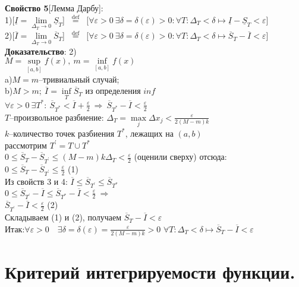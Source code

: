 \documentclass[a4paper,12pt]{article} %
\begin{document}
\noindent \textbf{Свойство 5}[Лемма Дарбу]:\\
1)[$\underline{I}=\lim\limits_{\Delta_T\rightarrow 0}{\underline{S}_T}$] $\stackrel{\text { def }}{=}$ [$\forall\varepsilon>0~\exists\delta = \delta(\varepsilon)>0: \forall T:\Delta_{T}<\delta \longmapsto \underline{I}-\underline{S}_T<\varepsilon$]\\
2)[$\overline{I}=\lim\limits_{\Delta_T\rightarrow 0}{\overline{S}_T}$] $\stackrel{\text { def }}{=}$ [$\forall\varepsilon>0~\exists\delta = \delta(\varepsilon)>0: \forall T:\Delta_{T}<\delta \longmapsto \overline{S}_T-\overline{I}<\varepsilon$]\\
\noindent \textbf{Доказательство}: 2)\\
$M=\sup\limits_{[a,b]}{f(x)},~m=\inf\limits_{[a,b]}{f(x)}$\\
a)$M=m$--тривиальный случай;\\
b)$M>m;~\overline{I}=\inf\limits_{T}{\overline{S}_T}$ из определения $inf$\\
$\forall \varepsilon>0~\exists T^{*}:~\overline{S}_{T^{*}}<\overline{I}+\frac{\varepsilon}{2}~\Rightarrow~\overline{S}_{T^{*}}-\overline{I}<\frac{\varepsilon}{2}$\\
$T$--произвольное разбиение: $\Delta_T=\max\limits_{j}{\Delta x_j}<\frac{\varepsilon}{2(M-m)k}$\\
$k$--количество точек разбиения $T^{*}$, лежащих на $(a,b)$\\
рассмотрим $T^{\prime}=T\cup T^{*}$\\
$0\leq \overline{S}_T-\overline{S}_{T^{\prime}}\leq (M-m)k\Delta_T<\frac{\varepsilon}{2}$ (оценили сверху) отсюда:\\
$0\leq \overline{S}_T-\overline{S}_{T^{\prime}}\leq \frac{\varepsilon}{2}$ (1)\\
Из свойств 3 и 4: $\overline{I}\leq \overline{S}_{T^{\prime}}\leq  \overline{S}_{T^{*}}$\\
$0\leq  \overline{S}_{T^{\prime}}-\overline{I}\leq \overline{S}_{T^{*}}-\overline{I}<\frac{\varepsilon}{2}~\Rightarrow$\\
$\overline{S}_{T^{\prime}}-\overline{I}<\frac{\varepsilon}{2}$ (2)\\
Складываем (1) и (2), получаем $ \overline{S}_T-\overline{I}<\varepsilon$\\
Итак:$\forall \varepsilon>0 \quad \exists \delta=\delta(\varepsilon)=\frac{\varepsilon}{2(M-m) k}>0$
$\forall T: \Delta_{T}<\delta \longmapsto\overline{S}_T-\overline{I}<\varepsilon$\\
\section*{Критерий интегрируемости функции.}
\end{document}
